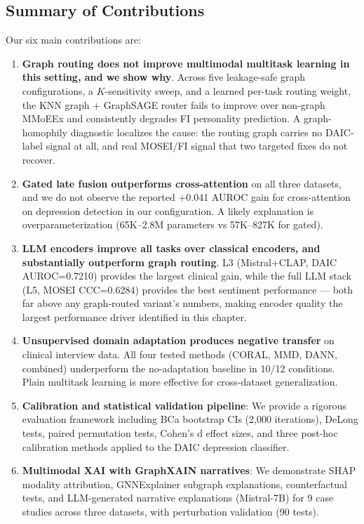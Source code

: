 \documentclass[12pt,oneside]{book}
\begin{document}
\subsection{Summary of Contributions}

Our six main contributions are:

\begin{enumerate}
    \item \textbf{Graph routing does not improve multimodal multitask learning in this setting, and we show why}. Across five leakage-safe graph configurations, a $K$-sensitivity sweep, and a learned per-task routing weight, the KNN graph + GraphSAGE router fails to improve over non-graph MMoEEx and consistently degrades FI personality prediction. A graph-homophily diagnostic localizes the cause: the routing graph carries no DAIC-label signal at all, and real MOSEI/FI signal that two targeted fixes do not recover.
    \item \textbf{Gated late fusion outperforms cross-attention} on all three datasets, and we do not observe the reported +0.041 AUROC gain for cross-attention on depression detection in our configuration. A likely explanation is overparameterization (65K--2.8M parameters vs 57K--827K for gated).
    \item \textbf{LLM encoders improve all tasks over classical encoders, and substantially outperform graph routing}. L3 (Mistral+CLAP, DAIC AUROC=0.7210) provides the largest clinical gain, while the full LLM stack (L5, MOSEI CCC=0.6284) provides the best sentiment performance — both far above any graph-routed variant's numbers, making encoder quality the largest performance driver identified in this chapter.
    \item \textbf{Unsupervised domain adaptation produces negative transfer} on clinical interview data. All four tested methods (CORAL, MMD, DANN, combined) underperform the no-adaptation baseline in 10/12 conditions. Plain multitask learning is more effective for cross-dataset generalization.
    \item \textbf{Calibration and statistical validation pipeline}: We provide a rigorous evaluation framework including BCa bootstrap CIs (2,000 iterations), DeLong tests, paired permutation tests, Cohen's d effect sizes, and three post-hoc calibration methods applied to the DAIC depression classifier.
    \item \textbf{Multimodal XAI with GraphXAIN narratives}: We demonstrate SHAP modality attribution, GNNExplainer subgraph explanations, counterfactual tests, and LLM-generated narrative explanations (Mistral-7B) for 9 case studies across three datasets, with perturbation validation (90 tests).
\end{enumerate}
\end{document}
